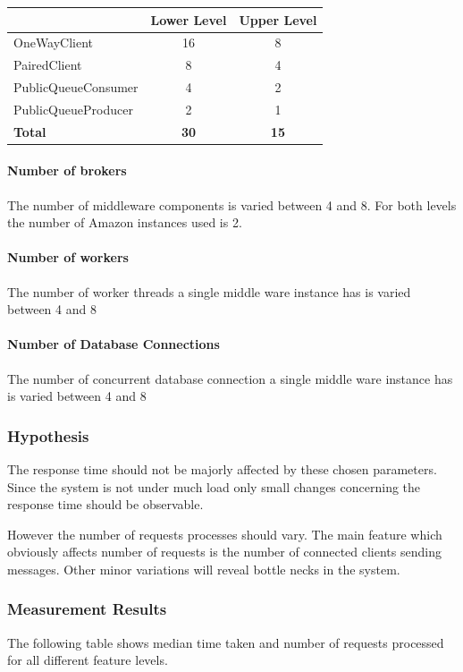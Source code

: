 \documentclass[milestone1.tex]{subfiles}
\begin{document}
\begin{tabular}{|l|c|c|}
\hline 
 & Lower Level & Upper Level \\ 
\hline 
OneWayClient & 16 & 8  \\ 
\hline 
PairedClient & 8 & 4 \\ 
\hline 
PublicQueueConsumer & 4 & 2 \\ 
\hline 
PublicQueueProducer & 2 & 1 \\ 
\hline 
\textbf{Total}  & \textbf{30} & \textbf{15} \\
\hline 
\end{tabular} 

\paragraph{Number of brokers}

The number of middleware components is varied between 4 and 8. For both levels the number of Amazon instances used is 2.

\paragraph{Number of workers}

The number of worker threads a single middle ware instance has is varied between 4 and 8

\paragraph{Number of Database Connections}

The number of concurrent database connection a single middle ware instance has is varied between 4 and 8


\subsubsection{Hypothesis}

The response time should not be majorly affected by these chosen parameters. Since the system is not under much load only small changes concerning the response time should be observable.

However the number of requests processes should vary. The main feature which obviously affects number of requests is the number of connected clients sending messages. Other minor variations will reveal bottle necks in the system.

\subsubsection{Measurement Results}
The following table shows median time taken and number of requests processed for all different feature levels.\\
\end{document}

